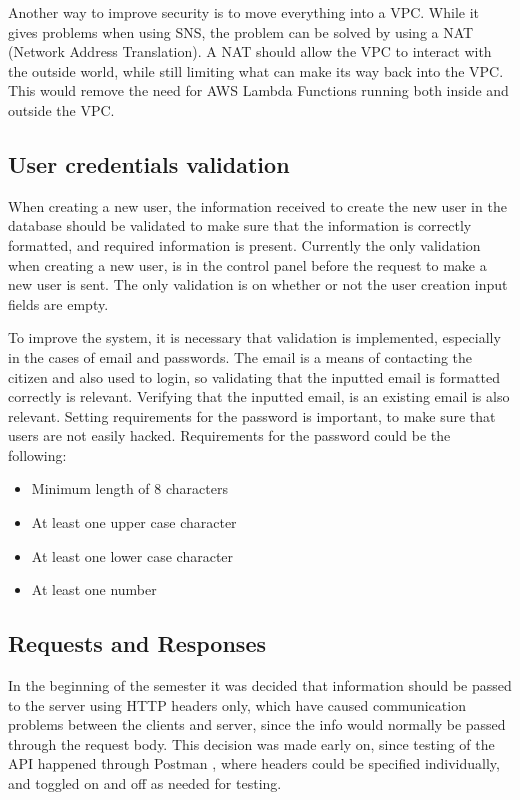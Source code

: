Another way to improve security is to move everything into a VPC. While it gives problems when using SNS, the problem can be solved by using a NAT (Network Address Translation). A NAT should allow the VPC to interact with the outside world, while still limiting what can make its way back into the VPC. This would remove the need for AWS Lambda Functions running both inside and outside the VPC.

\subsection{User credentials validation}
When creating a new user, the information received to create the new user in the database should be validated to make sure that the information is correctly formatted, and required information is present. Currently the only validation when creating a new user, is in the control panel before the request to make a new user is sent. The only validation is on whether or not the user creation input fields are empty.

To improve the system, it is necessary that validation is implemented, especially in the cases of email and passwords. The email is a means of contacting the citizen and also used to login, so validating that the inputted email is formatted correctly is relevant. Verifying that the inputted email, is an existing email is also relevant. Setting requirements for the password is important, to make sure that users are not easily hacked. Requirements for the password could be the following:
\begin{itemize}
    \item Minimum length of 8 characters
    \item At least one upper case character
    \item At least one lower case character
    \item At least one number
\end{itemize}


\subsection{Requests and Responses}
In the beginning of the semester it was decided that information should be passed to the server using HTTP headers only, which have caused communication problems between the clients and server, since the info would normally be passed through the request body.
This decision was made early on, since testing of the API happened through Postman \cite{postman}, where headers could be specified individually, and toggled on and off as needed for testing.


